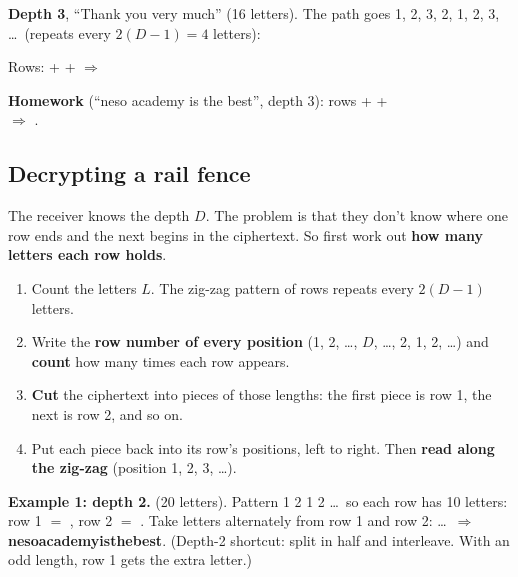 \textbf{Depth 3}, ``Thank you very much'' (16 letters). The path goes 1, 2, 3, 2, 1, 2, 3, \dots\ (repeats every $2(D-1) = 4$ letters):
\begin{center}
\end{center}
Rows:  +  +  $\Rightarrow$ \textbf{}

\textbf{Homework} (``neso academy is the best'', depth 3): rows  +  + \\ $\Rightarrow$ \textbf{}.

\subsection{Decrypting a rail fence}
The receiver knows the depth $D$. The problem is that they don't know where one row ends and the next begins in the ciphertext. So first work out \textbf{how many letters each row holds}.
\begin{keybox}[title={Rail fence decryption, step by step}]
\begin{enumerate}[leftmargin=1.5em]
  \item Count the letters $L$. The zig-zag pattern of rows repeats every $2(D-1)$ letters.
  \item Write the \textbf{row number of every position} (1, 2, \dots, $D$, \dots, 2, 1, 2, \dots) and \textbf{count} how many times each row appears.
  \item \textbf{Cut} the ciphertext into pieces of those lengths: the first piece is row 1, the next is row 2, and so on.
  \item Put each piece back into its row's positions, left to right. Then \textbf{read along the zig-zag} (position 1, 2, 3, \dots).
\end{enumerate}
\end{keybox}

\textbf{Example 1: depth 2.}  (20 letters). Pattern 1 2 1 2 \dots\ so each row has 10 letters:
row 1 $=$ , row 2 $=$ . Take letters alternately from row 1 and row 2:
\textbf{}\textbf{}\textbf{}\dots\ $\Rightarrow$ \textbf{nesoacademyisthebest}.
(Depth-2 shortcut: split in half and interleave. With an odd length, row 1 gets the extra letter.)

